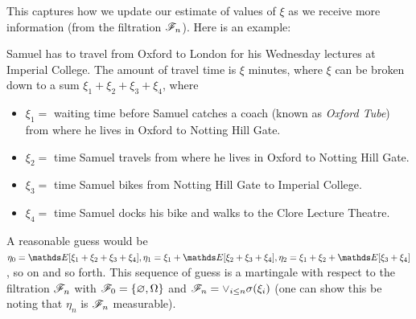 This captures how we update our estimate of values of $\xi$ as we receive more information (from the filtration $\mathcal{F}_n$). Here is an example:
\begin{example}
Samuel has to travel from Oxford to London for his Wednesday lectures at Imperial College. The amount of travel time is $\xi$ minutes, where $\xi$ can be broken down to a sum $\xi_1 + \xi_2 + \xi_3 + \xi_4$, where 
\begin{itemize}
    \item $\xi_1 = $ waiting time before Samuel catches a coach (known as \textit{Oxford Tube}) from where he lives in Oxford to Notting Hill Gate.
    \item $\xi_2 = $ time Samuel travels from where he lives in Oxford to Notting Hill Gate.
    \item $\xi_3 = $ time Samuel bikes from Notting Hill Gate to Imperial College.
    \item $\xi_4 = $ time Samuel docks his bike and walks to the Clore Lecture Theatre.
\end{itemize}
A reasonable guess would be $\eta_0 = \E[\xi_1 + \xi_2 + \xi_3 + \xi_4], \eta_1 = \xi_1 + \E[\xi_2 + \xi_3 + \xi_4], \eta_2 = \xi_1 + \xi_2 + \E[\xi_3 + \xi_4]$, so on and so forth. This sequence of guess is a martingale with respect to the filtration $\mathcal{F}_n$ with $\mathcal{F}_0 = \left\{ \varnothing, \Omega \right \}$ and $\mathcal{F}_n = \vee_{i\leq n} \sigma(\xi_i)$ (one can show this be noting that $\eta_n$ is $\mathcal{F}_n$ measurable). 
\end{example}


